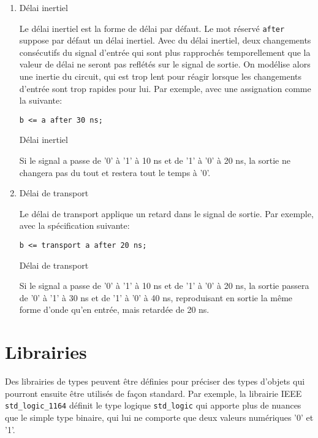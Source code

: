 \documentclass[letter, oneside]{book}
\begin{document}
\begin{enumerate}
\item Délai inertiel
\label{sec:org62d10ab}

Le délai inertiel est la forme de délai par défaut. Le mot réservé
\texttt{after} suppose par défaut un délai inertiel. Avec du délai inertiel,
deux changements consécutifs du signal d'entrée qui sont plus
rapprochés temporellement que la valeur de délai ne seront pas
reflétés sur le signal de sortie. On modélise alors une inertie du
circuit, qui est trop lent pour réagir lorsque les changements
d'entrée sont trop rapides pour lui. Par exemple, avec une
assignation comme la suivante:

\begin{listing}[htbp]
\begin{verbatim}
b <= a after 30 ns;
\end{verbatim}
\caption{Délai inertiel}
\end{listing}

Si le signal a passe de '0' à '1' à 10 ns et de '1' à '0' à 20 ns, la
sortie ne changera pas du tout et restera tout le temps à '0'.

\item Délai de transport
\label{sec:org1ef9c68}

Le délai de transport applique un retard dans le signal de sortie. Par
exemple, avec la spécification suivante:

\begin{listing}[htbp]
\begin{verbatim}
b <= transport a after 20 ns;
\end{verbatim}
\caption{Délai de transport}
\end{listing}
Si le signal a passe de '0' à '1' à 10 ns et de '1' à '0' à 20 ns, la
sortie passera de '0' à '1' à 30 ns et de '1' à '0' à 40 ns,
reproduisant en sortie la même forme d'onde qu'en entrée, mais
retardée de 20 ns.
\end{enumerate}

\section{Librairies}
\label{sec:org80723f9}

Des librairies de types peuvent être définies pour préciser des types
d'objets qui pourront ensuite être utilisés de façon standard. Par
exemple, la librairie IEEE \texttt{std\_logic\_1164} définit le type logique
\texttt{std\_logic} qui apporte plus de nuances que le simple type binaire,
qui lui ne comporte que deux valeurs numériques '0' et '1'.
\end{document}
